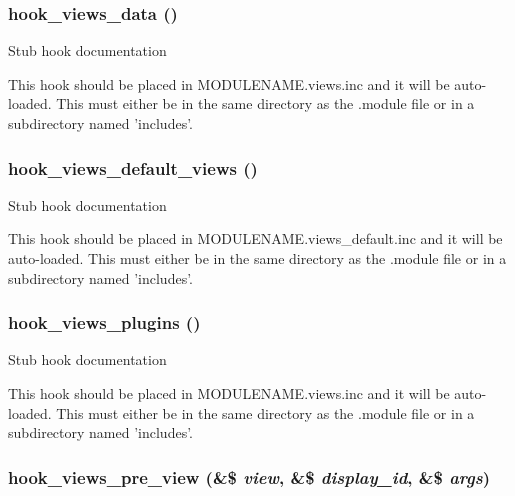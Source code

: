 \subsubsection{\setlength{\rightskip}{0pt plus 5cm}hook\_\-views\_\-data ()}\label{group__views__hooks_g227057901681e4a33e33c199c7a8c989}


Stub hook documentation

This hook should be placed in MODULENAME.views.inc and it will be auto-loaded. This must either be in the same directory as the .module file or in a subdirectory named 'includes'. 
\subsubsection{\setlength{\rightskip}{0pt plus 5cm}hook\_\-views\_\-default\_\-views ()}\label{group__views__hooks_g23edb74860682fa88f75cf94b97c2e15}


Stub hook documentation

This hook should be placed in MODULENAME.views\_\-default.inc and it will be auto-loaded. This must either be in the same directory as the .module file or in a subdirectory named 'includes'. 
\subsubsection{\setlength{\rightskip}{0pt plus 5cm}hook\_\-views\_\-plugins ()}\label{group__views__hooks_g23f6e9972b2ed84fc54b7ff63f44477d}


Stub hook documentation

This hook should be placed in MODULENAME.views.inc and it will be auto-loaded. This must either be in the same directory as the .module file or in a subdirectory named 'includes'. 
\subsubsection{\setlength{\rightskip}{0pt plus 5cm}hook\_\-views\_\-pre\_\-view (\&\$ {\em view}, \&\$ {\em display\_\-id}, \&\$ {\em args})}\label{group__views__hooks_g471b90caa886a4e4239a839d6bf7a963}


